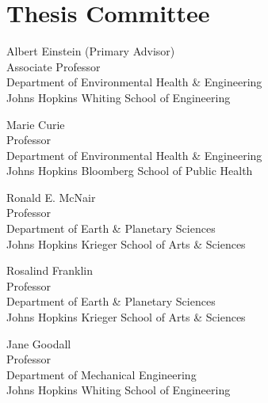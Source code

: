 \chapter*{Thesis Committee}

\begin{singlespace}

\noindent Albert Einstein (Primary Advisor)\\
Associate Professor\\
Department of Environmental Health \& Engineering\\
Johns Hopkins Whiting School of Engineering\\
\medskip

\noindent Marie Curie\\
Professor\\
Department of Environmental Health \& Engineering\\
Johns Hopkins Bloomberg School of Public Health\\
\medskip

\noindent Ronald E. McNair\\
Professor\\
Department of Earth \& Planetary Sciences\\
Johns Hopkins Krieger School of Arts \& Sciences\\
\medskip

\noindent Rosalind Franklin\\
Professor\\
Department of Earth \& Planetary Sciences\\
Johns Hopkins Krieger School of Arts \& Sciences\\
\medskip

\noindent Jane Goodall\\
Professor\\
Department of Mechanical Engineering\\
Johns Hopkins Whiting School of Engineering\\
\medskip 

\end{singlespace}

\newpage 